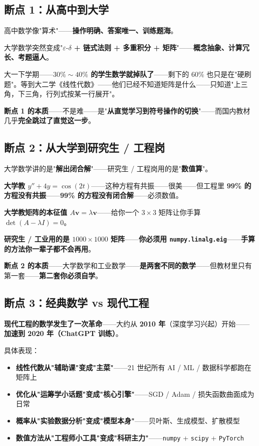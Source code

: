 \subsection*{断点 1：从高中到大学}

高中数学像"算术"——\textbf{操作明确、答案唯一、训练题海}。

大学数学突然变成"\textbf{$\varepsilon\text{-}\delta$ + 链式法则 + 多重积分 + 矩阵}"——\textbf{概念抽象、计算冗长、考题逼人}。

大一下学期——\textbf{$30\%\sim 40\%$ 的学生数学就掉队了}——剩下的 60\% 也只是在"硬刷题"。等到大二学《线性代数》——他们已经不知道矩阵是什么——只知道"上三角，下三角，行列式按某一行展开"。

\textbf{断点 1 的本质}——不是难——是"\textbf{从直觉学习到符号操作的切换}"——而国内教材几乎\textbf{完全跳过了直觉这一步}。

\subsection*{断点 2：从大学到研究生 / 工程岗}

大学数学讲的是"\textbf{解出闭合解}"——研究生 / 工程岗用的是"\textbf{数值算}"。

\textbf{大学教 $y'' + 4y = \cos(2t)$}——这种方程有共振——很美——但工程里 \textbf{99\% 的方程没有共振}——\textbf{99\% 的方程没有闭合解}——必须数值。

\textbf{大学教矩阵的本征值 $A\bm{v}=\lambda\bm{v}$}——给你一个 $3\times 3$ 矩阵让你手算 $\det(A-\lambda I)=0$。

\textbf{研究生 / 工业用的是 $1000\times 1000$ 矩阵}——\textbf{你必须用 \texttt{numpy.linalg.eig}}——\textbf{手算的方法你一辈子都不会再用}。

\textbf{断点 2 的本质}——大学数学和工业数学——\textbf{是两套不同的数学}——但教材里只有第一套——\textbf{第二套你必须自学}。

\subsection*{断点 3：经典数学 vs 现代工程}

\textbf{现代工程的数学发生了一次革命}——大约从 \textbf{2010 年}（深度学习兴起）开始——\textbf{加速到 2020 年（ChatGPT 训练）}。

具体表现：

\begin{itemize}
\item \textbf{线性代数从"辅助课"变成"主菜"}——21 世纪所有 AI / ML / 数据科学都跑在矩阵上
\item \textbf{优化从"运筹学小话题"变成"核心引擎"}——SGD / Adam / 损失函数曲面成为日常
\item \textbf{概率从"实验数据分析"变成"模型本身"}——贝叶斯、生成模型、扩散模型
\item \textbf{数值方法从"工程师小工具"变成"科研主力"}——\texttt{numpy} + \texttt{scipy} + \texttt{PyTorch}
\end{itemize}

